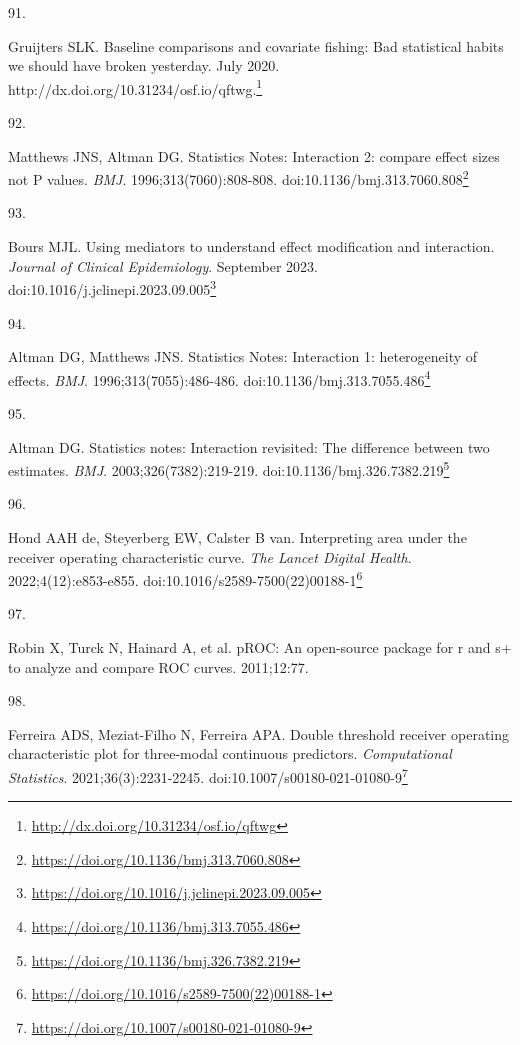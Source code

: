 \documentclass[
]{book}
\newlength{\cslhangindent}
\newlength{\csllabelwidth}
\newlength{\cslentryspacingunit} %
\newenvironment{CSLReferences}[2] %
 {%
  \setlength{\parindent}{0pt}
  \ifodd #1
  \let\oldpar\par
  \def\par{\hangindent=\cslhangindent\oldpar}
  \fi
  \setlength{\parskip}{#2\cslentryspacingunit}
 }%
 {}
\newcommand{\CSLLeftMargin}[1]{\parbox[t]{\csllabelwidth}{#1}}
\newcommand{\CSLRightInline}[1]{\parbox[t]{\linewidth - \csllabelwidth}{#1}\break}
\renewcommand{\href}[2]{#2\footnote{\url{#1}}}
\begin{document}
\begin{CSLReferences}{0}{0}
\leavevmode{}%
\CSLLeftMargin{91. }%
\CSLRightInline{Gruijters SLK. Baseline comparisons and covariate fishing: Bad statistical habits we should have broken yesterday. July 2020. \href{http://dx.doi.org/10.31234/osf.io/qftwg}{http://dx.doi.org/10.31234/osf.io/qftwg.}}

\leavevmode{}%
\CSLLeftMargin{92. }%
\CSLRightInline{Matthews JNS, Altman DG. Statistics Notes: Interaction 2: compare effect sizes not P values. \emph{BMJ}. 1996;313(7060):808-808. doi:\href{https://doi.org/10.1136/bmj.313.7060.808}{10.1136/bmj.313.7060.808}}

\leavevmode{}%
\CSLLeftMargin{93. }%
\CSLRightInline{Bours MJL. Using mediators to understand effect modification and interaction. \emph{Journal of Clinical Epidemiology}. September 2023. doi:\href{https://doi.org/10.1016/j.jclinepi.2023.09.005}{10.1016/j.jclinepi.2023.09.005}}

\leavevmode{}%
\CSLLeftMargin{94. }%
\CSLRightInline{Altman DG, Matthews JNS. Statistics Notes: Interaction 1: heterogeneity of effects. \emph{BMJ}. 1996;313(7055):486-486. doi:\href{https://doi.org/10.1136/bmj.313.7055.486}{10.1136/bmj.313.7055.486}}

\leavevmode{}%
\CSLLeftMargin{95. }%
\CSLRightInline{Altman DG. Statistics notes: Interaction revisited: The difference between two estimates. \emph{BMJ}. 2003;326(7382):219-219. doi:\href{https://doi.org/10.1136/bmj.326.7382.219}{10.1136/bmj.326.7382.219}}

\leavevmode{}%
\CSLLeftMargin{96. }%
\CSLRightInline{Hond AAH de, Steyerberg EW, Calster B van. Interpreting area under the receiver operating characteristic curve. \emph{The Lancet Digital Health}. 2022;4(12):e853-e855. doi:\href{https://doi.org/10.1016/s2589-7500(22)00188-1}{10.1016/s2589-7500(22)00188-1}}

\leavevmode{}%
\CSLLeftMargin{97. }%
\CSLRightInline{Robin X, Turck N, Hainard A, et al. pROC: An open-source package for r and s+ to analyze and compare ROC curves. 2011;12:77.}

\leavevmode{}%
\CSLLeftMargin{98. }%
\CSLRightInline{Ferreira ADS, Meziat-Filho N, Ferreira APA. Double threshold receiver operating characteristic plot for three-modal continuous predictors. \emph{Computational Statistics}. 2021;36(3):2231-2245. doi:\href{https://doi.org/10.1007/s00180-021-01080-9}{10.1007/s00180-021-01080-9}}


\end{CSLReferences}
\end{document}
